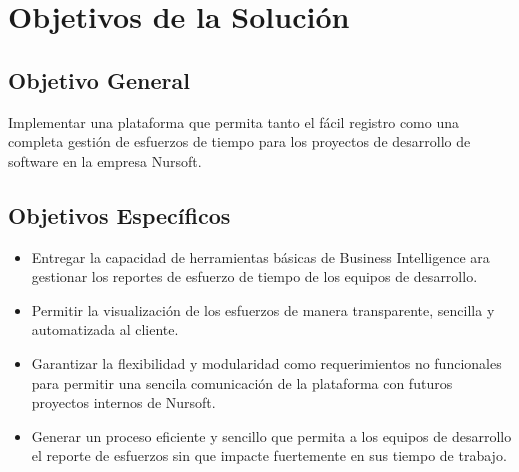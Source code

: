 \section{Objetivos de la Solución}

\subsection{Objetivo General}
Implementar una plataforma que permita tanto el fácil registro como una completa
gestión de esfuerzos de tiempo para los proyectos de desarrollo de software en la empresa Nursoft.
\subsection{Objetivos Específicos}

\begin{itemize}
  \item Entregar la capacidad de herramientas básicas de Business Intelligence
  ara gestionar los reportes de esfuerzo de tiempo de los equipos de desarrollo.
  \item Permitir la visualización de los esfuerzos de manera transparente,
  sencilla y automatizada al cliente.
  \item Garantizar la flexibilidad y modularidad como requerimientos no funcionales para permitir
  una sencila comunicación de la plataforma con futuros proyectos internos de Nursoft.
  \item Generar un proceso eficiente y sencillo que permita a los equipos de
  desarrollo el reporte de esfuerzos sin que impacte fuertemente en sus tiempo de trabajo.
\end{itemize}